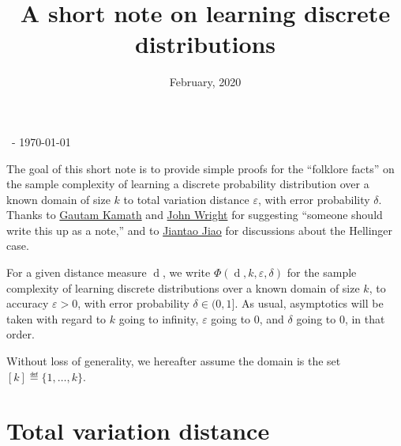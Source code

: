 \documentclass[10pt]{article}
\title{A short note on learning discrete distributions}
\date{February, 2020}
\newcommand{\dst}{\varepsilon}
\newcommand{\ab}{k}
\begin{document}
\begin{flushleft}\sf\footnotesize
\makeatletter
\@date~- \today \hfill \@title
\makeatother
\end{flushleft}
\vspace{5mm}

The goal of this short note is to provide simple proofs for the ``folklore facts'' on the sample complexity of learning a discrete probability distribution over a known domain of size $\ab$ to total variation distance $\dst$, with error probability $\delta$. Thanks to \href{http://www.gautamkamath.com/}{Gautam Kamath} and \href{http://www.mit.edu/~jswright/}{John Wright} for suggesting ``someone should write this up as a note,'' and to \href{https://people.eecs.berkeley.edu/~jiantao/}{Jiantao Jiao} for discussions about the Hellinger case.\bigskip

For a given distance measure $\operatorname{d}$, we write $\Phi(\operatorname{d},\ab,\dst,\delta)$ for the sample complexity of learning discrete distributions over a known domain of size $\ab$, to accuracy $\dst>0$, with error probability $\delta\in(0,1]$. As usual, asymptotics will be taken with regard to $\ab$ going to infinity, $\dst$ going to $0$, and $\delta$ going to $0$, in that order.

\noindent Without loss of generality, we hereafter assume the domain is the set $[\ab]\eqdef \{1,\dots,\ab\}$.
\section{Total variation distance}
\end{document}
